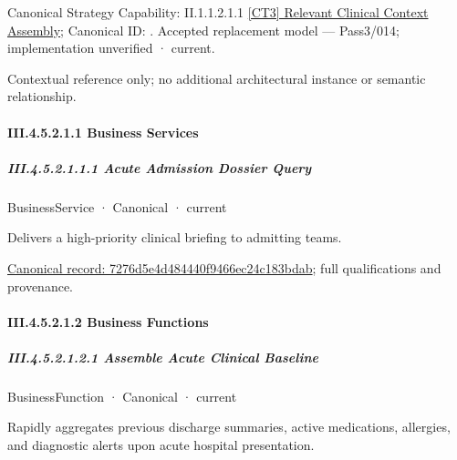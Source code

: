 {\small Canonical Strategy Capability: II.1.1.2.1.1 \hyperref[element:32bdf554780d4d6081fc3726fbba11df]{[CT3] Relevant Clinical Context Assembly}; Canonical ID: \texttt{}. Accepted replacement model — Pass3/014; implementation unverified · current.}\par
Contextual reference only; no additional architectural instance or semantic relationship.\par
\paragraph*{III.4.5.2.1.1 Business Services}
\label{navigation:III.4.5.2.1.1}

\subparagraph*{III.4.5.2.1.1.1 Acute Admission Dossier Query}
\label{navigation:III.4.5.2.1.1.1}

\label{element:7276d5e4d484440f9466ec24c183bdab}
{\small BusinessService · Canonical · current}\par

Delivers a high-priority clinical briefing to admitting teams.


{\footnotesize \href{../../../../../../../../continuum/business/business-service/7276d5e4d484440f9466ec24c183bdab.md}{Canonical record: 7276d5e4d484440f9466ec24c183bdab}; full qualifications and provenance.}\par
\paragraph*{III.4.5.2.1.2 Business Functions}
\label{navigation:III.4.5.2.1.2}

\subparagraph*{III.4.5.2.1.2.1 Assemble Acute Clinical Baseline}
\label{navigation:III.4.5.2.1.2.1}

\label{element:be64da1302bf4c4bae357295612e8e6e}
{\small BusinessFunction · Canonical · current}\par

Rapidly aggregates previous discharge summaries, active medications, allergies, and diagnostic alerts upon acute hospital presentation.


